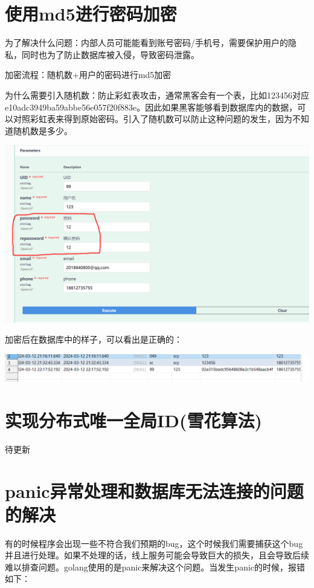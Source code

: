 \documentclass[12pt]{article}
\begin{document}
	\section{使用md5进行密码加密}
	为了解决什么问题：内部人员可能能看到账号密码/手机号，需要保护用户的隐私，同时也为了防止数据库被入侵，导致密码泄露。
	
	加密流程：随机数+用户的密码进行md5加密
	
	为什么需要引入随机数：防止彩虹表攻击，通常黑客会有一个表，比如123456对应e10adc3949ba59abbe56e057f20f883e。因此如果黑客能够看到数据库内的数据，可以对照彩虹表来得到原始密码。引入了随机数可以防止这种问题的发生，因为不知道随机数是多少。
	
	
	\includegraphics{19.png}
	
	加密后在数据库中的样子，可以看出是正确的：
	
	\includegraphics[scale=0.7]{20.png}
	
	
	
	\section{实现分布式唯一全局ID(雪花算法)}
	待更新
	
	\section{panic异常处理和数据库无法连接的问题的解决}
	有的时候程序会出现一些不符合我们预期的bug，这个时候我们需要捕获这个bug并且进行处理。如果不处理的话，线上服务可能会导致巨大的损失，且会导致后续难以排查问题。golang使用的是panic来解决这个问题。当发生panic的时候，报错如下：
	
\end{document}
